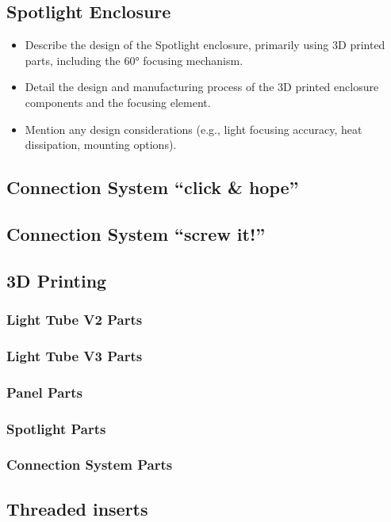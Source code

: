 \subsection{Spotlight Enclosure}
\label{subsec:spotlight_enclosure}
\begin{itemize}
	\item Describe the design of the Spotlight enclosure, primarily using 3D printed parts, including the 60° focusing mechanism.
	\item Detail the design and manufacturing process of the 3D printed enclosure components and the focusing element.
	\item Mention any design considerations (e.g., light focusing accuracy, heat dissipation, mounting options).
\end{itemize}

\subsection{Connection System \enquote{click \& hope}}

\subsection{Connection System \enquote{screw it!}}

\subsection{3D Printing}

\subsubsection{Light Tube V2 Parts}

\subsubsection{Light Tube V3 Parts}

\subsubsection{Panel Parts}

\subsubsection{Spotlight Parts}

\subsubsection{Connection System Parts}

\subsection{Threaded inserts}